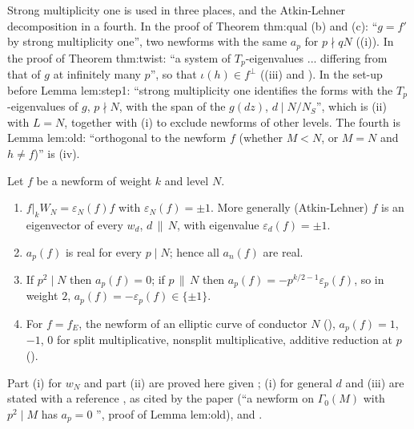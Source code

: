 \begin{paperlink}\label{pl:hecke:smo}
Strong multiplicity one is used in three places, and the Atkin-Lehner decomposition in a fourth. In the proof of Theorem thm:qual (b) and (c): ``$g=f'$ by strong multiplicity one'', two newforms with the same $a_p$ for $p\nmid qN$
((i)). In the proof of Theorem thm:twist: ``a system of $T_p$-eigenvalues ... differing from that of $g$ at infinitely many $p$'', so that $\iota(h)\in f^\perp$
((iii) and ). In the set-up before Lemma lem:step1: ``strong multiplicity one identifies the forms with
the $T_p$-eigenvalues of $g$, $p\nmid N$, with the span of the $g(dz)$, $d\mid N/N_S$'', which is (ii) with $L=N$, together with (i) to exclude newforms of
other levels. The fourth is Lemma lem:old: ``orthogonal to the newform $f$ (whether $M<N$, or $M=N$ and $h\ne f$)'' is (iv).
\end{paperlink}

\begin{proposition}\label{prop:hecke:newform-local}
Let $f$ be a newform of weight $k$ and level $N$.
\begin{enumerate}[label=(\roman*)]
\item $f|_kW_N=\varepsilon_N(f)f$ with $\varepsilon_N(f)=\pm1$. More generally (Atkin-Lehner) $f$ is an eigenvector of every $w_d$, $d\,\|\,N$, with eigenvalue $\varepsilon_d(f)=\pm1$.
\item $a_p(f)$ is real for every $p\mid N$; hence all $a_n(f)$ are real.
\item If $p^2\mid N$ then $a_p(f)=0$; if $p\,\|\,N$ then $a_p(f)=-p^{k/2-1}\varepsilon_p(f)$, so in weight $2$, $a_p(f)=-\varepsilon_p(f)\in\{\pm1\}$.
\item For $f=f_E$, the newform of an elliptic curve of conductor $N$ (), $a_p(f)=1$, $-1$, $0$ for split multiplicative, nonsplit multiplicative, additive reduction at
$p$ ().
\end{enumerate}
Part (i) for $w_N$ and part (ii) are proved here given ; (i) for general $d$ and (iii) are stated with a reference \cite{AtkinLehner70}, as cited by the
paper (``a newform on $\Gamma_0(M)$ with $p^2\mid M$ has $a_p=0$ \cite[Theorem 3]{AtkinLehner70}'', proof of Lemma lem:old), and \cite[Sections 5.8, 6.6]{DiamondShurman}.
\end{proposition}

